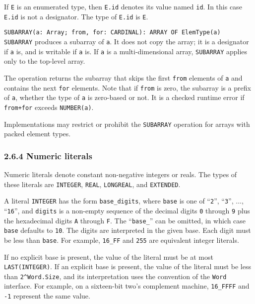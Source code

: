 \documentclass[10pt]{article}
\begin{document}
\begin{description}
  If \verb|E| is an enumerated type, then \verb|E.id| denotes its value named
  \verb|id|.  In this case \verb|E.id| is not a designator.  The type of
  \verb|E.id| is \verb|E|.
\item \verb|SUBARRAY(a: Array; from, for: CARDINAL): ARRAY OF ElemType(a)| \\
  \verb|SUBARRAY| produces a subarray of \verb|a|.  It does not copy the
  array; it is a designator if \verb|a| is, and is writable if \verb|a| is.
  If \verb|a| is a multi-dimensional array, \verb|SUBARRAY| applies only to
  the top-level array.

  The operation returns the subarray that skips the first \verb|from| elements
  of \verb|a| and contains the next \verb|for| elements.  Note that if
  \verb|from| is zero, the subarray is a prefix of \verb|a|, whether the type
  of \verb|a| is zero-based or not.  It is a checked runtime error if
  \verb|from+for| exceeds \verb|NUMBER(a)|.

  Implementations may restrict or prohibit the \verb|SUBARRAY| operation for
  arrays with packed element types.
\end{description}

\subsubsection*{2.6.4 Numeric literals}

Numeric literals denote constant non-negative integers or reals.  The types of
these literals are \verb|INTEGER|, \verb|REAL|, \verb|LONGREAL|, and
\verb|EXTENDED|.

A literal \verb|INTEGER| has the form \verb|base_digits|, where \verb|base| is
one of ``\verb|2|'', ``\verb|3|'', ..., ``\verb|16|'', and \verb|digits| is a
non-empty sequence of the decimal digits \verb|0| through \verb|9| plus the
hexadecimal digits \verb|A| through \verb|F|.  The ``\verb|base_|'' can be
omitted, in which case \verb|base| defaults to \verb|10|.  The digits are
interpreted in the given base.  Each digit must be less than \verb|base|.  For
example, \verb|16_FF| and \verb|255| are equivalent integer literals.

If no explicit base is present, the value of the literal must be at most
\verb|LAST(INTEGER)|.  If an explicit base is present, the value of the
literal must be less than \verb|2^Word.Size|, and its interpretation uses the
convention of the \verb|Word| interface.  For example, on a sixteen-bit two's
complement machine, \verb|16_FFFF| and \verb|-1| represent the same value.
\end{document}
